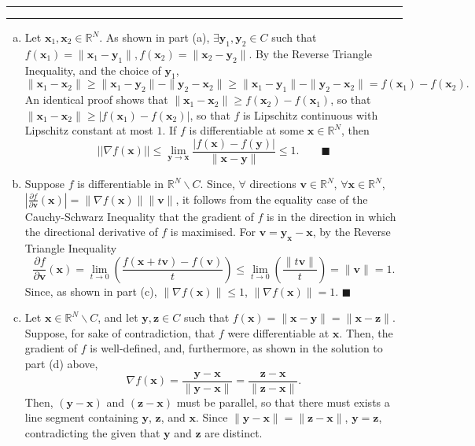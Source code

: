 \documentclass[11pt]{article}
\newcounter{questionCounter}
\newcounter{partCounter}[questionCounter]
\newenvironment{question}[2][\arabic{questionCounter}]{%
    \setcounter{partCounter}{0}%
    \vspace{.25in} \hrule \vspace{0.5em}%
        \noindent{\bf #2}%
    \vspace{0.8em} \hrule \vspace{.10in}%
    \addtocounter{questionCounter}{1}%
}{}
\begin{document}
\begin{question}{Problem 1}
\begin{enumerate}[(a)]
\item Let $\mathbf{x}_1, \mathbf{x}_2 \in \mathbb{R}^N$. As shown in part (a),
$\exists \mathbf{y}_1, \mathbf{y}_2 \in C$ such that
$f(\mathbf{x}_1) = \|\mathbf{x}_1 - \mathbf{y}_1\|,
f(\mathbf{x}_2) = \|\mathbf{x}_2 - \mathbf{y}_2\|$. By the Reverse Triangle
Inequality, and the choice of $\mathbf{y}_1$,
\[\|\mathbf{x}_1 - \mathbf{x}_2\| \geq
\|\mathbf{x}_1 - \mathbf{y}_2\| - \|\mathbf{y}_2 - \mathbf{x}_2\|
 \geq \|\mathbf{x}_1 - \mathbf{y}_1\| - \|\mathbf{y}_2 - \mathbf{x}_2\|
 = f(\mathbf{x}_1) - f(\mathbf{x}_2).\]
An identical proof shows that $\|\mathbf{x}_1 - \mathbf{x}_2\| \geq
f(\mathbf{x}_2) - f(\mathbf{x}_1)$, so that
$\|\mathbf{x}_1 - \mathbf{x}_2\| \geq |f(\mathbf{x}_1) - f(\mathbf{x}_2)|$,
so that $f$ is Lipschitz continuous with Lipschitz constant at most $1$.
If $f$ is differentiable at some $\mathbf{x} \in \mathbb{R}^N$, then
\[||\nabla f(\mathbf{x})|| \leq \lim_{\mathbf{y} \rightarrow \mathbf{x}}
\frac{|f(\mathbf{x}) - f(\mathbf{y})|}{\|\mathbf{x} - \mathbf{y}\|} \leq 1.
\qquad \blacksquare\]

\item Suppose $f$ is differentiable in $\mathbb{R}^N \backslash C$.
Since, $\forall$ directions $\mathbf{v} \in \mathbb{R}^N$,
$\forall \mathbf{x} \in \mathbb{R}^N$,
$\left|\frac{\partial f}{\partial \mathbf{v}} (\mathbf{x})\right|
 = \|\nabla f (\mathbf{x})\| \|\mathbf{v}\|$, it follows from the equality case
of the Cauchy-Schwarz Inequality that the gradient of $f$ is in the direction
in which the directional derivative of $f$ is maximised.
For $\mathbf{v} = \mathbf{y}_{\mathbf{x}} - \mathbf{x}$, by the Reverse
Triangle Inequality
\[\frac{\partial f}{\partial \mathbf{v}} (\mathbf{x})
 = \lim_{t \rightarrow 0} \left(\frac{f(\mathbf{x} + t\mathbf{v}) - f(\mathbf{v})}{t}\right)
 \leq \lim_{t \rightarrow 0} \left(\frac{\|t\mathbf{v}\|}{t}\right) = \|\mathbf{v}\| = 1.\]
Since, as shown in part (c), $\| \nabla f (\mathbf{x}) \| \leq 1$,
$\|\nabla f(\mathbf{x})\| = 1$. \qquad $\blacksquare$

\item Let $\mathbf{x} \in \mathbb{R}^N \backslash C$, and let
$\mathbf{y},\mathbf{z} \in C$ such that
$f(\mathbf{x}) = \|\mathbf{x} - \mathbf{y}\| = \|\mathbf{x} - \mathbf{z}\|$.
Suppose, for sake of contradiction, that $f$ were differentiable at
$\mathbf{x}$. Then, the gradient of $f$ is well-defined, and, furthermore, as
shown in the solution to part (d) above, \[\nabla f(\mathbf{x})
 = \frac{\mathbf{y} - \mathbf{x}}{\|\mathbf{y} - \mathbf{x}\|}
 = \frac{\mathbf{z} - \mathbf{x}}{\|\mathbf{z} - \mathbf{x}\|}.\]
Then,
$(\mathbf{y} - \mathbf{x})$ and $(\mathbf{z} - \mathbf{x})$ must be
parallel, so that there must exists a line segment containing $\mathbf{y}$,
$\mathbf{z}$, and $\mathbf{x}$. Since
 $\|\mathbf{y} - \mathbf{x}\| = \|\mathbf{z} - \mathbf{x}\|$,
$\mathbf{y} = \mathbf{z}$, contradicting the given that $\mathbf{y}$ and
$\mathbf{z}$ are distinct.


\end{enumerate}
\end{question}
\end{document}
